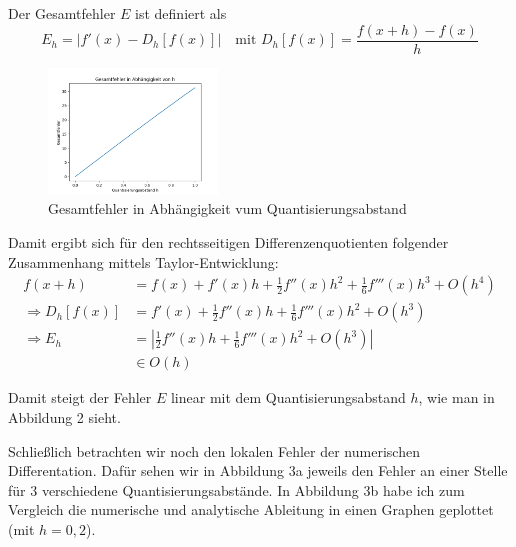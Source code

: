 \documentclass{article}
\begin{document}
	Der Gesamtfehler $E$ ist definiert als
	$$ E_h = |f'(x) - D_h[f(x)]|\quad\text{mit } D_h[f(x)] = \frac{f(x+h)-f(x)}{h} $$
	\begin{figure}
		\centering
		\includegraphics[width=0.4\textwidth]{Figure_2}
		\caption{Gesamtfehler in Abhängigkeit vum Quantisierungsabstand}
	\end{figure}
	Damit ergibt sich für den rechtsseitigen Differenzenquotienten folgender Zusammenhang mittels Taylor-Entwicklung:
	\begin{align*}
		f(x+h) &= f(x) + f'(x)h + \frac{1}{2}f''(x)h^2 + \frac{1}{6}f'''(x)h^3 + O(h^4)\\
		\Rightarrow D_h[f(x)] &= f'(x) + \frac{1}{2}f''(x)h+\frac{1}{6}f'''(x)h^2+O(h^3)\\
		\Rightarrow E_h &= \left| \frac{1}{2}f''(x)h+\frac{1}{6}f'''(x)h^2+O(h^3)\right|\\
		&\in O(h)
	\end{align*}

	Damit steigt der Fehler $E$ linear mit dem Quantisierungsabstand $h$, wie man in Abbildung 2 sieht.
	
	Schließlich betrachten wir noch den lokalen Fehler der numerischen Differentation. Dafür sehen wir in Abbildung 3a jeweils den Fehler an einer Stelle für 3 verschiedene Quantisierungsabstände. In Abbildung 3b habe ich zum Vergleich die numerische und analytische Ableitung in einen Graphen geplottet (mit $h = 0,2$).
	
\end{document}

